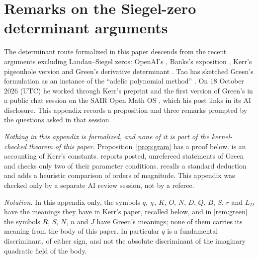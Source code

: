 \appendix
\section{Remarks on the Siegel-zero determinant arguments}\label{app:siegel}

The determinant route formalized in this paper descends from the recent arguments excluding Landau--Siegel zeros: OpenAI's \cite{OAIsiegel}, Banks's exposition \cite{Banks2026}, Kerr's pigeonhole version \cite{Kerr2026} and Green's derivative determinant \cite{Green2026v1,Green2026}. Tao has sketched Green's formulation as an instance of the ``adelic polynomial method'' \cite{TaoSketch2026}. On 18 October 2026 (UTC) he worked through Kerr's preprint and the first version of Green's in a public chat session on the SAIR Open Math OS \cite{OMOSsession2026}, which his post links in its AI disclosure. This appendix records a proposition and three remarks prompted by the questions asked in that session.

\emph{Nothing in this appendix is formalized, and none of it is part of the kernel-checked theorem of this paper.} Proposition~\ref{prop:gram} has a proof below.  is an accounting of Kerr's constants.  reports posted, unrefereed statements of Green and checks only two of their parameter conditions.  recalls a standard deduction and adds a heuristic comparison of orders of magnitude. This appendix was checked only by a separate AI review session, not by a referee.

\emph{Notation.} In this appendix only, the symbols $q$, $\chi$, $K$, $O$, $N$, $D$, $Q$, $B$, $S$, $r$ and $L_D$ have the meanings they have in Kerr's paper, recalled below, and in \cref{rem:green} the symbols $R$, $S$, $N$, $n$ and $J$ have Green's meanings; none of them carries its meaning from the body of this paper. In particular $q$ is a fundamental discriminant, of either sign, and not the absolute discriminant of the imaginary quadratic field of the body.

